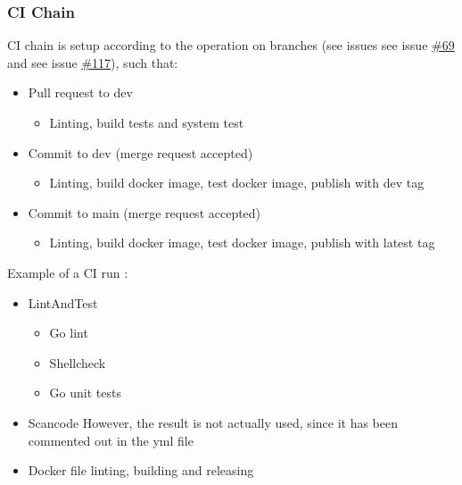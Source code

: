\subsubsection{CI Chain}
CI chain is setup according to the operation on branches (see issues see issue \href{https://github.com/DevelOpsITU/MiniTwit/issues/69}{\#69} and see issue \href{https://github.com/DevelOpsITU/MiniTwit/issues/117}{\#117}), such that: 
\begin{itemize}
    \item Pull request to dev
    \begin{itemize}
        \item Linting, build tests and system test
    \end{itemize}
    
    \item Commit to dev (merge request accepted)
    \begin{itemize}
        \item Linting, build docker image, test docker image, publish with dev tag
    \end{itemize}
    
    \item Commit to main (merge request accepted)
    \begin{itemize}
        \item Linting, build docker image, test docker image, publish with latest tag
    \end{itemize}
\end{itemize}


Example of a CI run \cite{ci_run_example_1}: 
\begin{itemize}
    \item LintAndTest
    \begin{itemize}
        \item Go lint \cite{golinter.sh}
        \item Shellcheck \cite{shellchecker.sh}
        \item Go unit tests 
    \end{itemize}
    \item Scancode \cite{scancode_dockerfile}
        However, the result is not actually used, since it has been commented out in the yml file\cite{pullreq_to_dev_yml}
  
    
    \item Docker file linting, building and releasing
\end{itemize}

